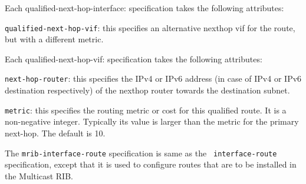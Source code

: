 \begin{description}
\begin{description}
  Each {\stt qualified-next-hop-interface}: specification takes the
  following attributes:

\begin{description}

\item{\tt qualified-next-hop-vif}: this specifies an alternative
  nexthop vif for the route, but with a different metric.

  Each {\stt qualified-next-hop-vif}: specification takes the following
  attributes:

\begin{description}
\item{\tt next-hop-router}: this specifies the IPv4 or IPv6 address (in
  case of IPv4 or IPv6 destination respectively) of the nexthop router
  towards the destination subnet.
\item{\tt metric}: this specifies the routing metric or cost for this
  qualified route.  It is a non-negative integer.  Typically its value
  is larger than the metric for the primary next-hop.
  The default is 10.
\end{description}

\end{description}

\end{description}

\end{description}

The {\tt mrib-interface-route} specification is same as the {\tt
interface-route} specification, except that it is used to configure
routes that are to be installed in the Multicast RIB.

\newpage
